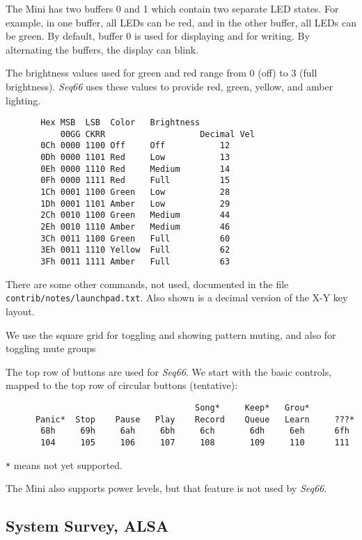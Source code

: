    The Mini has two buffers 0 and 1 which contain two separate LED states. For
   example, in one buffer, all LEDs can be red, and in the other buffer, all LEDs
   can be green.  By default, buffer 0 is used for displaying and for writing.
   By alternating the buffers, the display can blink.

   The brightness values used for green and red range from 0 (off) to 3 (full
   brightness).  \textsl{Seq66} uses these values to provide red, green, yellow,
   and amber lighting.

   \begin{verbatim}
       Hex MSB  LSB  Color   Brightness
           00GG CKRR                   Decimal Vel
       0Ch 0000 1100 Off     Off           12
       0Dh 0000 1101 Red     Low           13
       0Eh 0000 1110 Red     Medium        14
       0Fh 0000 1111 Red     Full          15
       1Ch 0001 1100 Green   Low           28
       1Dh 0001 1101 Amber   Low           29
       2Ch 0010 1100 Green   Medium        44
       2Eh 0010 1110 Amber   Medium        46
       3Ch 0011 1100 Green   Full          60
       3Eh 0011 1110 Yellow  Full          62
       3Fh 0011 1111 Amber   Full          63
   \end{verbatim}

   There are some other commands, not used, documented in the
   file \texttt{contrib/notes/launchpad.txt}.
   Also shown is a decimal version of the X-Y key layout.

   We use the square grid for toggling and showing pattern muting, and also for
   toggling mute groups

   The top row of buttons are used for \textsl{Seq66}. We start with the basic
   controls, mapped to the top row of circular buttons (tentative):

   \begin{verbatim}
                                      Song*     Keep*   Grou*
      Panic*  Stop    Pause   Play    Record    Queue   Learn     ???*
       68h     69h     6ah     6bh     6ch       6dh     6eh      6fh
       104     105     106     107     108       109     110      111
   \end{verbatim}

   \texttt{*} means not yet supported.

   The Mini also supports power levels, but that feature is not used by
   \textsl{Seq66}.

\subsection{System Survey, ALSA}
\label{subsec:launchpad_mini_survey_alsa}

